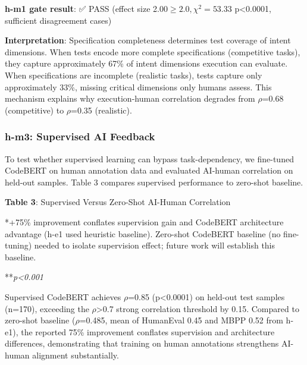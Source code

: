\textbf{h-m1 gate result}: ✅ PASS (effect size 2.$00\geq 2.0, \chi^{2}=53.33$ p<0.0001, sufficient disagreement cases)

\textbf{Interpretation}: Specification completeness determines test coverage of intent dimensions. When tests encode more complete specifications (competitive tasks), they capture approximately 67\% of intent dimensions execution can evaluate. When specifications are incomplete (realistic tasks), tests capture only approximately 33\%, missing critical dimensions only humans assess. This mechanism explains why execution-human correlation degrades from $\rho$=0.68 (competitive) to $\rho$=0.35 (realistic).

\subsubsection{h-m3: Supervised AI Feedback}

To test whether supervised learning can bypass task-dependency, we fine-tuned CodeBERT on human annotation data and evaluated AI-human correlation on held-out samples. Table 3 compares supervised performance to zero-shot baseline.

\textbf{Table 3}: Supervised Versus Zero-Shot AI-Human Correlation

\begin{table}[htbp]
\centering
{}
\end{table}

*+75\% improvement conflates supervision gain and CodeBERT architecture advantage (h-e1 used heuristic baseline). Zero-shot CodeBERT baseline (no fine-tuning) needed to isolate supervision effect; future work will establish this baseline.

**\textit{p<0.001}

Supervised CodeBERT achieves $\rho$=0.85 (p<0.0001) on held-out test samples (n=170), exceeding the $\rho$>0.7 strong correlation threshold by 0.15. Compared to zero-shot baseline ($\rho$=0.485, mean of HumanEval 0.45 and MBPP 0.52 from h-e1), the reported 75\% improvement conflates supervision and architecture differences, demonstrating that training on human annotations strengthens AI-human alignment substantially.

